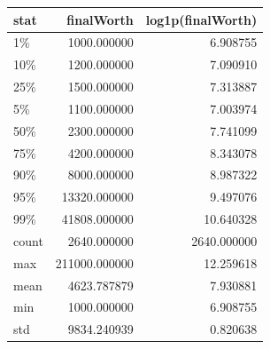 \begin{tabular}{lrr}
\toprule
stat & finalWorth & log1p(finalWorth) \\
\midrule
1\% & 1000.000000 & 6.908755 \\
10\% & 1200.000000 & 7.090910 \\
25\% & 1500.000000 & 7.313887 \\
5\% & 1100.000000 & 7.003974 \\
50\% & 2300.000000 & 7.741099 \\
75\% & 4200.000000 & 8.343078 \\
90\% & 8000.000000 & 8.987322 \\
95\% & 13320.000000 & 9.497076 \\
99\% & 41808.000000 & 10.640328 \\
count & 2640.000000 & 2640.000000 \\
max & 211000.000000 & 12.259618 \\
mean & 4623.787879 & 7.930881 \\
min & 1000.000000 & 6.908755 \\
std & 9834.240939 & 0.820638 \\
\bottomrule
\end{tabular}
